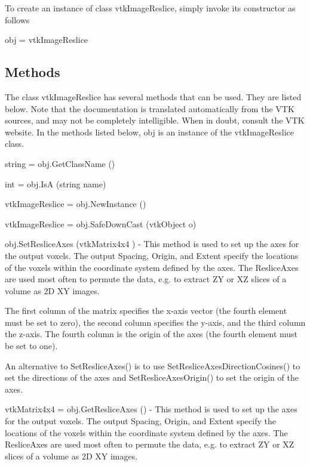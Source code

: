 To create an instance of class vtk\-Image\-Reslice, simply invoke its constructor as follows \begin{DoxyVerb}  obj = vtkImageReslice
\end{DoxyVerb}
 \hypertarget{vtkwidgets_vtkxyplotwidget_Methods}{}\subsection{Methods}\label{vtkwidgets_vtkxyplotwidget_Methods}
The class vtk\-Image\-Reslice has several methods that can be used. They are listed below. Note that the documentation is translated automatically from the V\-T\-K sources, and may not be completely intelligible. When in doubt, consult the V\-T\-K website. In the methods listed below, {\ttfamily obj} is an instance of the vtk\-Image\-Reslice class. 
\begin{DoxyItemize}
\item {\ttfamily string = obj.\-Get\-Class\-Name ()}  
\item {\ttfamily int = obj.\-Is\-A (string name)}  
\item {\ttfamily vtk\-Image\-Reslice = obj.\-New\-Instance ()}  
\item {\ttfamily vtk\-Image\-Reslice = obj.\-Safe\-Down\-Cast (vtk\-Object o)}  
\item {\ttfamily obj.\-Set\-Reslice\-Axes (vtk\-Matrix4x4 )} -\/ This method is used to set up the axes for the output voxels. The output Spacing, Origin, and Extent specify the locations of the voxels within the coordinate system defined by the axes. The Reslice\-Axes are used most often to permute the data, e.\-g. to extract Z\-Y or X\-Z slices of a volume as 2\-D X\-Y images. 

The first column of the matrix specifies the x-\/axis vector (the fourth element must be set to zero), the second column specifies the y-\/axis, and the third column the z-\/axis. The fourth column is the origin of the axes (the fourth element must be set to one). 

An alternative to Set\-Reslice\-Axes() is to use Set\-Reslice\-Axes\-Direction\-Cosines() to set the directions of the axes and Set\-Reslice\-Axes\-Origin() to set the origin of the axes.  
\item {\ttfamily vtk\-Matrix4x4 = obj.\-Get\-Reslice\-Axes ()} -\/ This method is used to set up the axes for the output voxels. The output Spacing, Origin, and Extent specify the locations of the voxels within the coordinate system defined by the axes. The Reslice\-Axes are used most often to permute the data, e.\-g. to extract Z\-Y or X\-Z slices of a volume as 2\-D X\-Y images. 


\end{DoxyItemize}
